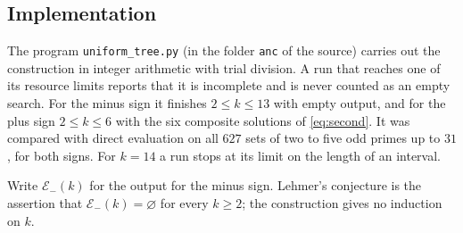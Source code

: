 \subsection*{Implementation}
The program \texttt{uniform\_tree.py} (in the folder \texttt{anc} of
the source) carries out the construction in integer arithmetic with
trial division. A run that reaches one of its resource limits reports
that it is incomplete and is never counted as an empty search. For the
minus sign it finishes $2\le k\le13$ with empty output, and for the
plus sign $2\le k\le6$ with the six composite solutions of
\eqref{eq:second}. It was compared with direct evaluation on all $627$
sets of two to five odd primes up to $31$, for both signs. For $k=14$
a run stops at its limit on the length of an interval.

Write $\mathcal E_{-}(k)$ for the output for the minus sign. Lehmer's
conjecture is the assertion that $\mathcal E_{-}(k)=\varnothing$ for
every $k\ge2$; the construction gives no induction on $k$.
